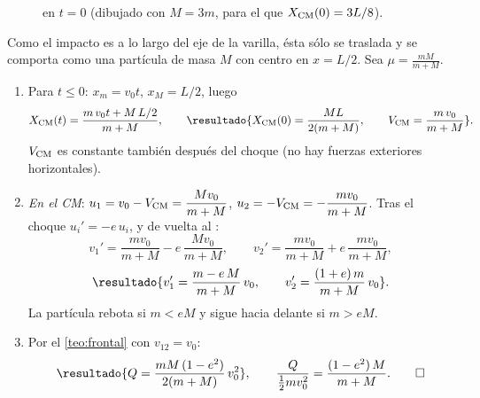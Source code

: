\begin{figure}[ht]
\centering
{}
\caption{ en $t=0$ (dibujado con $M=3m$, para el que $X_{\mathrm{CM}}(0)=3L/8$).}
\label{fig:varilla}
\end{figure}

\begin{resolucion}
Como el impacto es a lo largo del eje de la varilla, ésta sólo se traslada y se
comporta como una partícula de masa $M$ con centro en $x=L/2$. Sea $\mu=\frac{mM}{m+M}$.
\begin{enumerate}
  \item[(a)] Para $t\le0$: $x_{m}=v_{0}t$, $x_{M}=L/2$, luego
  \[
    X\cm(t)=\frac{m\,v_{0}t+M\,L/2}{m+M},\qquad
    \resultado{X\cm(0)=\frac{ML}{2(m+M)},\qquad V\cm=\frac{m\,v_{0}}{m+M}} .
  \]
  $V_{\mathrm{CM}}$ es constante también después del choque (no hay fuerzas exteriores horizontales).
  \item[(b)] \emph{En el CM}: $u_{1}=v_{0}-V_{\mathrm{CM}}=\dfrac{Mv_{0}}{m+M}$, $u_{2}=-V_{\mathrm{CM}}=-\dfrac{mv_{0}}{m+M}$.
  Tras el choque $u_{i}'=-e\,u_{i}$, y de vuelta al \lab:
  \[
    v_{1}'=\frac{mv_{0}}{m+M}-e\,\frac{Mv_{0}}{m+M},\qquad
    v_{2}'=\frac{mv_{0}}{m+M}+e\,\frac{mv_{0}}{m+M},
  \]
  \[
    \resultado{v_{1}'=\frac{m-e\,M}{m+M}\,v_{0},\qquad v_{2}'=\frac{(1+e)\,m}{m+M}\,v_{0}} .
  \]
  La partícula rebota si $m<eM$ y sigue hacia delante si $m>eM$.
  \item[(c)] Por el \cref{teo:frontal} con $v_{12}=v_{0}$:
  \[
    \resultado{Q=\frac{mM\,(1-e^{2})}{2(m+M)}\,v_{0}^{2}},\qquad
    \frac{Q}{\frac12mv_{0}^{2}}=\frac{(1-e^{2})\,M}{m+M} .\qedhere
  \]
\end{enumerate}
\end{resolucion}

